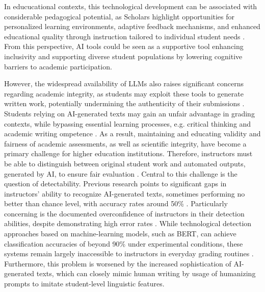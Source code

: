 \documentclass[12pt]{article}
\begin{document}
In educucational contexts, this technological development can be associated with considerable pedagogical potential, as Scholars highlight opportunities for personalized learning environments, adaptive feedback mechanisms, and enhanced educational quality through instruction tailored to individual student needs \autocites[449]{orhani_risks_2025}[96]{kumar_ai_2025}. From this perspective, AI tools could be seen as a supportive tool enhancing inclusivity and supporting diverse student populations by lowering cognitive barriers to academic participation. 

However, the widespread availability of LLMs also raises significant concerns regarding academic integrity, as students may exploit these tools to generate written work, potentially undermining the authenticity of their submissions \autocite[2]{fleckenstein_teachers_2024}. Students relying on AI-generated texts may gain an unfair advantage in grading contexts, while bypassing essential learning processes, e.g. critical thinking and academic writing ompetence \autocites[2]{fleckenstein_teachers_2024}[4]{rahimi_ai_2025}. As a result, maintaining and educating validity and fairness of academic assessments, as well as scientific integrity, have become a primary challenge for higher education institutions. Therefore, instructors must be able to distinguish between original student work and automated outputs, generated by AI, to ensure fair evaluation \autocites[2]{fleckenstein_teachers_2024}[3]{deriba_fairness_2025}. Central to this challenge is the question of detectability. Previous research points to significant gaps in instructors' ability to recognize AI-generated texts, sometimes performing no better than chance level, with accuracy rates around 50\% \autocite[1]{fleckenstein_teachers_2024}. Particularly concerning is the documented overconfidence of instructors in their detection abilities, despite demonstrating high error rates \autocite[1]{fleckenstein_teachers_2024}. While technological detection approaches based on machine-learning models, such as BERT, can achieve classification accuracies of beyond 90\% under experimental conditions, these systems remain largely inaccessible to instructors in everyday grading routines \autocite[6]{walker_text_2024}. Furthermore, this problem is worsened by the increased sophistication of AI-generated texts, which can closely mimic human writing by usage of humanizing prompts to imitate student-level linguistic features. 
\end{document}
